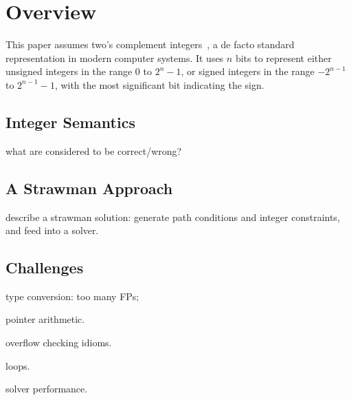 \section{Overview}
\label{s:oview}

This paper assumes two's complement integers~\cite{intel:int}, a
de facto standard representation in modern computer systems.  It
uses $n$ bits to represent either unsigned integers in the range
$0$ to $2^n-1$, or signed integers in the range $-2^{n-1}$ to
$2^{n-1}-1$, with the most significant bit indicating the sign.

\subsection{Integer Semantics}

what are considered to be correct/wrong?

\subsection{A Strawman Approach}

describe a strawman solution:
generate path conditions and integer constraints,
and feed into a solver.

\subsection{Challenges}

type conversion: too many FPs;

pointer arithmetic.

overflow checking idioms.

loops.

solver performance.
